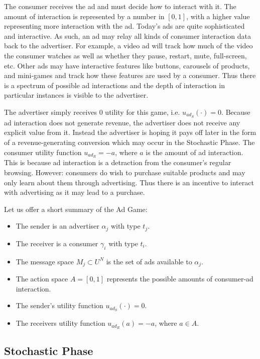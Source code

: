 \documentclass{article}
\begin{document}
The consumer receives the ad and must decide how to interact with it. The amount of interaction is represented by a number in $[0,1]$, with a higher value representing more interaction with the ad. Today's ads are quite sophisticated and interactive. As such, an ad may relay all kinds of consumer interaction data back to the advertiser. For example, a video ad will track how much of the video the consumer watches as well as whether they pause, restart, mute, full-screen, etc. Other ads may have interactive features like buttons, carousels of products, and mini-games and track how these features are used by a consumer. Thus there is a spectrum of possible ad interactions and the depth of interaction in particular instances is visible to the advertiser.

The advertiser simply receives 0 utility for this game, i.e. $u_{ad_S}(\cdot) = 0$. Because ad interaction does not generate revenue, the advertiser does not receive any explicit value from it. Instead the advertiser is hoping it pays off later in the form of a revenue-generating conversion which may occur in the Stochastic Phase. The consumer utility function $u_{ad_R} = -a$, where $a$ is the amount of ad interaction. This is because ad interaction is a detraction from the consumer's regular browsing. However: consumers do wish to purchase suitable products and may only learn about them through advertising. Thus there is an incentive to interact with advertising as it may lead to a purchase.

Let us offer a short summary of the Ad Game:

\begin{itemize}
	\item The sender is an advertiser $\alpha_j$ with type $t_j$.
	\item The receiver is a consumer $\gamma_i$ with type $t_i$.
	\item The message space $M_j \subset U^N$ is the set of ads available to $\alpha_j$.
	\item The action space $A = [0,1]$ represents the possible amounts of consumer-ad interaction.
	\item The sender's utility function $u_{ad_S}(\cdot) = 0$.
	\item The receivers utility function $u_{ad_R}(a) = -a$, where $a \in A$.
\end{itemize}

\subsection{Stochastic Phase}
\end{document}
